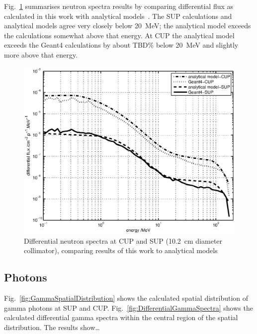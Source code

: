 \documentclass[11pt,a4paper]{IEEEtran}
\let\MYoriglatexcaption\caption
\renewcommand{\caption}[2][\relax]{\MYoriglatexcaption[#2]{#2}}
\begin{document}
Fig.~\ref{fig:DifferentialSpectra} summarises neutron spectra results by comparing differential flux as calculated in this work with analytical models~\cite{Prokofiev2009,Prokofiev2014}.
The SUP calculations and analytical models agree very closely below \SI{20}{\MeV}; the analytical model exceeds the calculations somewhat above that energy.
At CUP the analytical model exceeds the Geant4 calculations by about TBD\% below \SI{20}{\MeV} and slightly more above that energy.

\begin{figure}[t]
    \centering
    \includegraphics[width=0.9\columnwidth]{DiffYieldComparedSUPCUP10.eps}
    \caption{
        Differential neutron spectra at CUP and SUP (\SI{10.2}{\cm} diameter collimator), comparing results of this work to analytical models~\cite{Prokofiev2009,Prokofiev2014}
    }
    \label{fig:DifferentialSpectra}
\end{figure}

\subsection{Photons}
Fig.~\ref{fig:GammaSpatialDistribution} shows the calculated spatial distribution of gamma photons at SUP and CUP.
Fig.~\ref{fig:DifferentialGammaSpectra} shows the calculated differential gamma spectra within the central region of the spatial distribution.
The results show\ldots
{}
\end{document}
